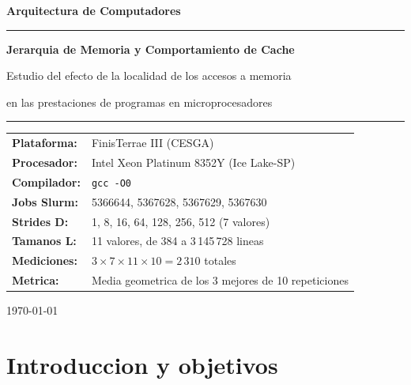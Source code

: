 \documentclass[12pt,a4paper]{article}
\begin{document}
\begin{titlepage}
  \centering\vspace*{2cm}
  {\LARGE\bfseries\color{azul} Arquitectura de Computadores\par}
  \vspace{0.4cm}{\large Practica 1\par}\vspace{1.2cm}
  \rule{0.8\textwidth}{1pt}\vspace{0.5cm}

  {\LARGE\bfseries Jerarquia de Memoria y Comportamiento de Cache\par}
  \vspace{0.3cm}
  {\large Estudio del efecto de la localidad de los accesos a memoria\par
   en las prestaciones de programas en microprocesadores\par}
  \vspace{0.5cm}\rule{0.8\textwidth}{1pt}\vspace{2cm}

  \begin{tabular}{ll}
    \textbf{Plataforma:} & FinisTerrae III (CESGA) \\[4pt]
    \textbf{Procesador:} & Intel Xeon Platinum 8352Y (Ice Lake-SP) \\[4pt]
    \textbf{Compilador:} & \texttt{gcc -O0} \\[4pt]
    \textbf{Jobs Slurm:}  & 5366644, 5367628, 5367629, 5367630 \\[4pt]
    \textbf{Strides D:}   & 1, 8, 16, 64, 128, 256, 512 (7 valores) \\[4pt]
    \textbf{Tamanos L:}   & 11 valores, de 384 a 3\,145\,728 lineas \\[4pt]
    \textbf{Mediciones:}  & $3 \times 7 \times 11 \times 10 = 2\,310$ totales \\[4pt]
    \textbf{Metrica:}     & Media geometrica de los 3 mejores de 10 repeticiones \\
  \end{tabular}
  \vfill{\large\today\par}
\end{titlepage}

\tableofcontents\clearpage

\section{Introduccion y objetivos}
\end{document}
